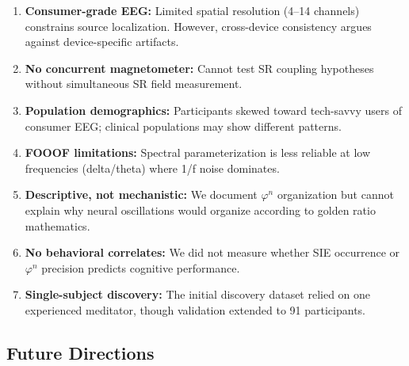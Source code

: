 \documentclass[11pt,a4paper]{article}
\newcommand{\phisym}{\varphi}
\begin{document}
\begin{enumerate}
    \item \textbf{Consumer-grade EEG:} Limited spatial resolution (4--14 channels) constrains source localization. However, cross-device consistency argues against device-specific artifacts.

    \item \textbf{No concurrent magnetometer:} Cannot test SR coupling hypotheses without simultaneous SR field measurement.

    \item \textbf{Population demographics:} Participants skewed toward tech-savvy users of consumer EEG; clinical populations may show different patterns.

    \item \textbf{FOOOF limitations:} Spectral parameterization is less reliable at low frequencies (delta/theta) where 1/f noise dominates.

    \item \textbf{Descriptive, not mechanistic:} We document $\phisym^n$ organization but cannot explain why neural oscillations would organize according to golden ratio mathematics.

    \item \textbf{No behavioral correlates:} We did not measure whether SIE occurrence or $\phisym^n$ precision predicts cognitive performance.

    \item \textbf{Single-subject discovery:} The initial discovery dataset relied on one experienced meditator, though validation extended to 91 participants.
\end{enumerate}

\subsection{Future Directions}
\end{document}
